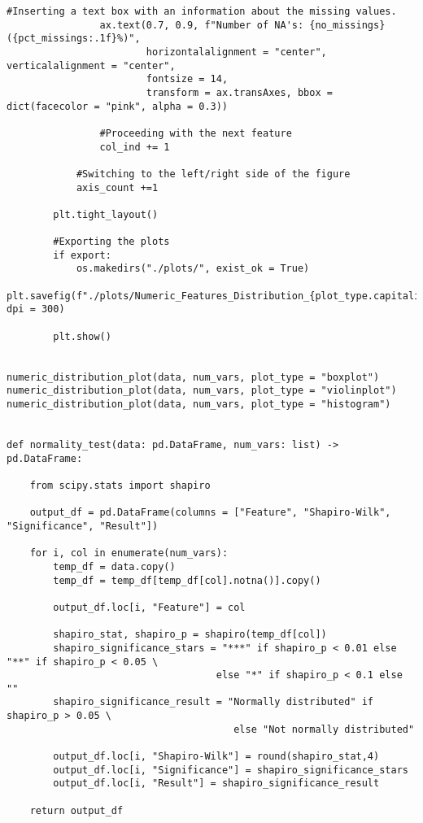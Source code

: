 \begin{lstlisting}[basicstyle=\footnotesize\ttfamily]
                #Inserting a text box with an information about the missing values.
                ax.text(0.7, 0.9, f"Number of NA's: {no_missings} ({pct_missings:.1f}%)",
                        horizontalalignment = "center", verticalalignment = "center",
                        fontsize = 14,
                        transform = ax.transAxes, bbox = dict(facecolor = "pink", alpha = 0.3))
                
                #Proceeding with the next feature
                col_ind += 1

            #Switching to the left/right side of the figure
            axis_count +=1
        
        plt.tight_layout()
        
        #Exporting the plots
        if export:
            os.makedirs("./plots/", exist_ok = True)
            plt.savefig(f"./plots/Numeric_Features_Distribution_{plot_type.capitalize()}s.jpg", dpi = 300)
    
        plt.show()


numeric_distribution_plot(data, num_vars, plot_type = "boxplot")
numeric_distribution_plot(data, num_vars, plot_type = "violinplot")
numeric_distribution_plot(data, num_vars, plot_type = "histogram")


def normality_test(data: pd.DataFrame, num_vars: list) -> pd.DataFrame:

    from scipy.stats import shapiro

    output_df = pd.DataFrame(columns = ["Feature", "Shapiro-Wilk", "Significance", "Result"])
    
    for i, col in enumerate(num_vars):
        temp_df = data.copy()
        temp_df = temp_df[temp_df[col].notna()].copy()

        output_df.loc[i, "Feature"] = col

        shapiro_stat, shapiro_p = shapiro(temp_df[col])
        shapiro_significance_stars = "***" if shapiro_p < 0.01 else "**" if shapiro_p < 0.05 \ 
		                            else "*" if shapiro_p < 0.1 else ""
        shapiro_significance_result = "Normally distributed" if shapiro_p > 0.05 \
                                       else "Not normally distributed"

        output_df.loc[i, "Shapiro-Wilk"] = round(shapiro_stat,4)
        output_df.loc[i, "Significance"] = shapiro_significance_stars
        output_df.loc[i, "Result"] = shapiro_significance_result
        
    return output_df



\end{lstlisting}
